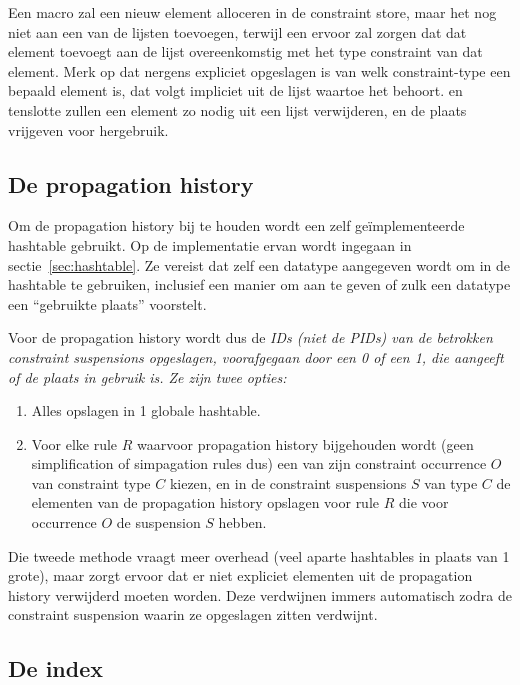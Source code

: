 Een  macro zal een nieuw element alloceren in de constraint store, maar het nog niet aan een van de lijsten toevoegen, terwijl een  ervoor zal zorgen dat dat element toevoegt aan de lijst overeenkomstig met het type constraint van dat element. Merk op dat nergens expliciet opgeslagen is van welk constraint-type een bepaald element is, dat volgt impliciet uit de lijst waartoe het behoort.  en  tenslotte zullen een element zo nodig uit een lijst verwijderen, en de plaats vrijgeven voor hergebruik.

\subsection{De propagation history} \label{sec:prophist}


Om de propagation history bij te houden wordt een zelf ge\"implementeerde hashtable gebruikt. Op de implementatie ervan wordt ingegaan in sectie~\ref{sec:hashtable}. Ze vereist dat zelf een datatype aangegeven wordt om in de hashtable te gebruiken, inclusief een manier om aan te geven of zulk een datatype een ``gebruikte plaats'' voorstelt.

Voor de propagation history wordt dus de \em{ID}s (niet de \em{PID}s) van de betrokken constraint suspensions opgeslagen, voorafgegaan door een 0 of een 1, die aangeeft of de plaats in gebruik is. Ze zijn twee opties: \begin{enumerate}
  \item Alles opslagen in 1 globale hashtable.
  \item Voor elke rule $R$ waarvoor propagation history bijgehouden wordt (geen simplification of simpagation rules dus) een van zijn constraint occurrence $O$ van constraint type $C$ kiezen, en in de constraint suspensions $S$ van type $C$ de elementen van de propagation history opslagen voor rule $R$ die voor occurrence $O$ de suspension $S$ hebben.
\end{enumerate}
Die tweede methode vraagt meer overhead (veel aparte hashtables in plaats van 1 grote), maar zorgt ervoor dat er niet expliciet elementen uit de propagation history verwijderd moeten worden. Deze verdwijnen immers automatisch zodra de constraint suspension waarin ze opgeslagen zitten verdwijnt.

\subsection{De index} \label{sec:index}

